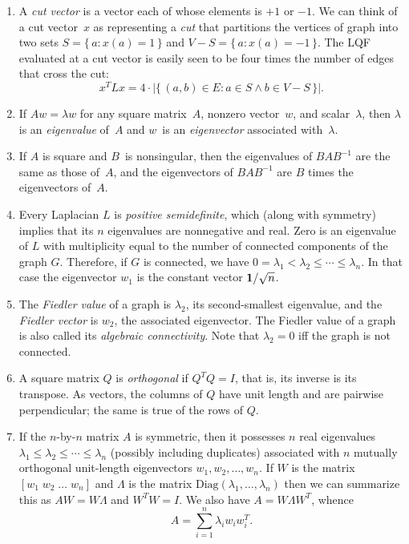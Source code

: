 \documentclass[11pt]{article}
\newcommand{\m}[1]{{\bf{#1}}}       %
\newcommand{\ones}{\m1}             %
\newcommand{\Diag}{\mbox{Diag}}
\begin{document}
\begin{enumerate}
\item
A {\em cut vector} is a vector each of whose elements is $+1$ or $-1$.
We can think of a cut vector~$x$ as representing a {\em cut} that partitions
the vertices of graph into two sets $S = \{\,a : x(a) = 1\,\}$
and $V-S = \{\,a : x(a) = -1\,\}$.
The LQF evaluated at a cut vector is easily seen to be four times the number 
of edges that cross the cut:
$$ x^TLx = 4\cdot|\{\,(a,b)\in E : a\in S \wedge b\in V-S\,\}|.$$

\item\label{eig}
If $Aw=\lambda w$ for any square matrix~$A$, nonzero vector~$w$, and scalar~$\lambda$, 
then $\lambda$ is an {\em eigenvalue} of~$A$ and $w$~is an {\em eigenvector}
associated with~$\lambda$.

\item
If $A$ is square and $B$~is nonsingular, then the eigenvalues of $BAB^{-1}$ are the
same as those of~$A$, 
and the eigenvectors of $BAB^{-1}$ are $B$ times the eigenvectors of~$A$.

\item
Every Laplacian $L$ is {\em positive semidefinite}, 
which (along with symmetry) implies that its $n$ eigenvalues are nonnegative and real.
Zero is an eigenvalue of $L$ with multiplicity
equal to the number of connected components of the graph $G$.  
Therefore,
if $G$ is connected, we have $0 = \lambda_1 < \lambda_2 \leq \cdots \leq \lambda_n$.
In that case the eigenvector $w_1$ is the constant vector $\ones/\sqrt n$.

\item
The {\em Fiedler value} of a graph is $\lambda_2$, its second-smallest eigenvalue,
and the {\em Fiedler vector} is $w_2$, the associated eigenvector.
The Fiedler value of a graph is also called its {\em algebraic connectivity}.
Note that $\lambda_2=0$ iff the graph is not connected.

\item
A square matrix $Q$ is {\em orthogonal} if $Q^TQ=I$, that is, its inverse
is its transpose.  
As vectors, the columns of $Q$ have unit length and are pairwise perpendicular; 
the same is true of the rows of $Q$.

\item\label{symeig}
If the $n$-by-$n$ matrix $A$ is symmetric, then it possesses $n$ real eigenvalues
$\lambda_1\leq\lambda_2\leq\cdots\leq\lambda_n$ (possibly including duplicates) 
associated with $n$ mutually orthogonal unit-length eigenvectors
$w_1, w_2, \ldots, w_n$.  If $W$ is the matrix $[w_1\; w_2\; \ldots\; w_n]$
and $\Lambda$ is the matrix $\Diag(\lambda_1,\ldots,\lambda_n)$
then we can summarize this as $AW = W\Lambda$ and $W^TW=I$.
We also have $A=W\Lambda W^T$, whence
$$A = \sum_{i=1}^n \lambda_i w_iw_i^T.$$


\end{enumerate}
\end{document}
